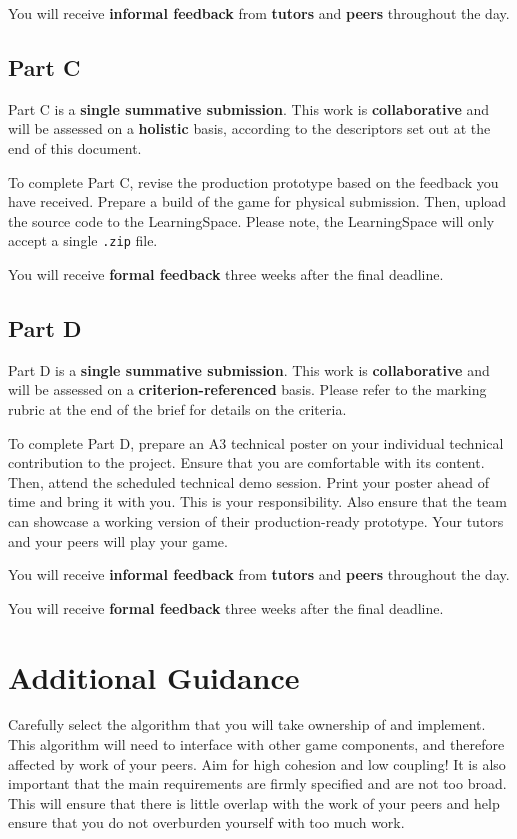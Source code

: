 \documentclass{../../fal_assignment}
\begin{document}
You will receive \textbf{informal feedback} from \textbf{tutors} and \textbf{peers} throughout the day.

\subsection*{Part C}

Part C is a \textbf{single summative submission}. This work is \textbf{collaborative} and will be assessed on a \textbf{holistic} basis, according to the descriptors set out at the end of this document.

To complete Part C, revise the production prototype based on the feedback you have received. Prepare a build of the game for physical submission. Then, upload the source code to the LearningSpace. Please note, the LearningSpace will only accept a single \texttt{.zip} file.

You will receive \textbf{formal feedback} three weeks after the final deadline.

\subsection*{Part D}

Part D is a \textbf{single summative submission}. This work is \textbf{collaborative} and will be assessed on a \textbf{criterion-referenced} basis. Please refer to the marking rubric at the end of the brief for details on the criteria.

To complete Part D, prepare an A3 technical poster on your individual technical contribution to the project. Ensure that you are comfortable with its content. Then, attend the scheduled technical demo session. Print your poster ahead of time and bring it with you. This is your responsibility. Also ensure that the team can showcase a working version of their production-ready prototype. Your tutors and your peers will play your game.

You will receive \textbf{informal feedback} from \textbf{tutors} and \textbf{peers} throughout the day.

You will receive \textbf{formal feedback} three weeks after the final deadline.

\section*{Additional Guidance}

Carefully select the algorithm that you will take ownership of and implement. This algorithm will need to interface with other game components, and therefore affected by work of your peers. Aim for high cohesion and low coupling! It is also important that the main requirements are firmly specified and are not too broad. This will ensure that there is little overlap with the work of your peers and help ensure that you do not overburden yourself with too much work. 
\end{document}
